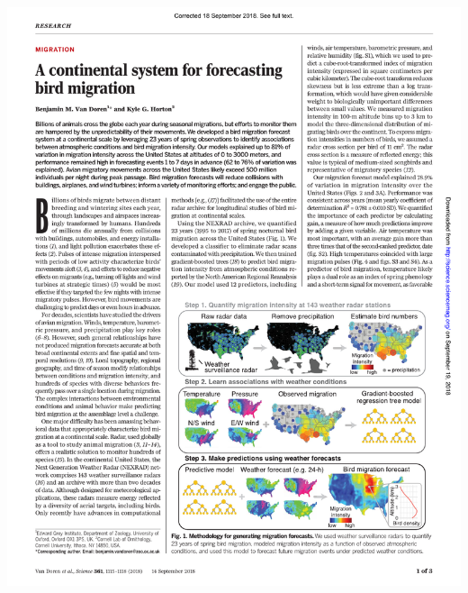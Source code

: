 \documentclass[a4paper, twoside]{templates/ociamthesis}
\begin{document}
\minitoc 

\newpage

\begin{center}\includegraphics[width=1\linewidth]{pdf_chapters/forecast/forecast_crop_Part1} \end{center}
\end{document}
